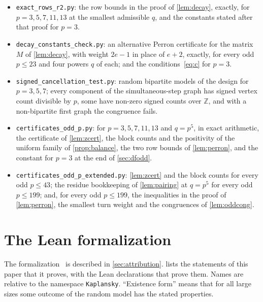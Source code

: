 \documentclass[11pt]{article}
\theoremstyle{definition}
\theoremstyle{plain}
\newcommand{\Z}{\mathbb{Z}}
\begin{document}
\begin{itemize}[itemsep=1pt]
\item \texttt{exact\_rows\_r2.py}: the row bounds in the proof of \cref{lem:decay}, exactly, for $p=3,5,7,11,13$ at the smallest admissible $q$, and the constants stated after that proof for $p=3$.
\item \texttt{decay\_constants\_check.py}: an alternative Perron certificate for the matrix $M$ of \cref{lem:decay}, with weight $2e-1$ in place of $e+2$, exactly, for every odd $p\le23$ and four powers $q$ of each; and the conditions~\eqref{eq:c} for $p=3$.
\item \texttt{signed\_cancellation\_test.py}: random bipartite models of the design for $p=3,5,7$; every component of the simultaneous-step graph has signed vertex count divisible by $p$, some have non-zero signed counts over $\Z$, and with a non-bipartite first graph the congruence fails.
\item \texttt{certificates\_odd\_p.py}: for $p=3,5,7,11,13$ and $q=p^5$, in exact arithmetic, the certificate of \cref{lem:zcert}, the block counts and the positivity of the uniform family of \cref{prop:balance}, the two row bounds of \cref{lem:perron}, and the constant for $p=3$ at the end of \cref{sec:dfodd}.
\item \texttt{certificates\_odd\_p\_extended.py}: \cref{lem:zcert} and the block counts for every odd $p\le43$; the residue bookkeeping of \cref{lem:pairing} at $q=p^5$ for every odd $p\le199$; and, for every odd $p\le199$, the inequalities in the proof of \cref{lem:perron}, the smallest turn weight and the congruences of \cref{lem:oddcong}.
\end{itemize}

\section{The Lean formalization}\label{app:lean}

The formalization~\cite{MghirbiLean} is described in \cref{sec:attribution}.  lists the statements of this paper that it proves, with the Lean declarations that prove them. Names are relative to the namespace \texttt{Kaplansky}. ``Existence form'' means that for all large sizes some outcome of the random model has the stated properties.
\end{document}
